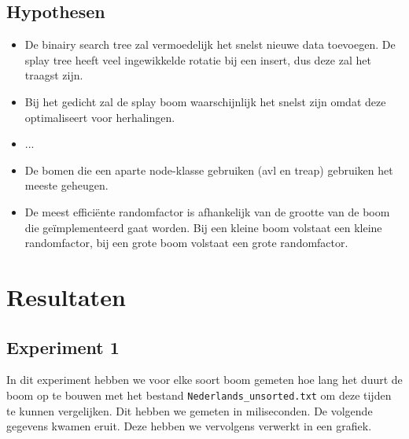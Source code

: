 \documentclass[a4paper,10pt]{article}
\begin{document}
\subsection{Hypothesen}

\begin{itemize}
\item De binairy search tree zal vermoedelijk het snelst nieuwe data toevoegen. De splay tree heeft veel ingewikkelde rotatie bij een insert, dus deze zal het traagst zijn.
\item Bij het gedicht zal de splay boom waarschijnlijk het snelst zijn omdat deze optimaliseert voor herhalingen.
\item ...
\item De bomen die een aparte node-klasse gebruiken (avl en treap) gebruiken het meeste geheugen.
\item De meest effici\"ente randomfactor is afhankelijk van de grootte van de boom die geïmplementeerd gaat worden. Bij een kleine boom volstaat een kleine randomfactor, bij een grote boom volstaat een grote randomfactor.
\end{itemize}

\section{Resultaten}

\subsection{Experiment 1}
In dit experiment hebben we voor elke soort boom gemeten hoe lang het duurt de boom op te bouwen met het bestand  \texttt{Nederlands\_unsorted.txt} om deze tijden te kunnen vergelijken. Dit hebben we gemeten in miliseconden. De volgende gegevens kwamen eruit. Deze hebben we vervolgens verwerkt in een grafiek. \\

\end{document}
